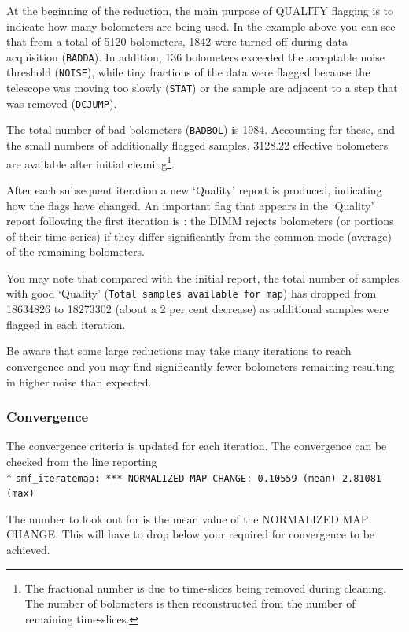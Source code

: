 At the beginning of the reduction, the main purpose of QUALITY
flagging is to indicate how many bolometers are being used. In the
example above you can see that from a total of 5120 bolometers, 1842
were turned off during data acquisition (\texttt{BADDA}). In addition,
136 bolometers exceeded the acceptable noise threshold
(\texttt{NOISE}), while tiny fractions of the data were flagged
because the telescope was moving too slowly (\texttt{STAT}) or the
sample are adjacent to a step that was removed (\texttt{DCJUMP}).

The total number of bad bolometers (\texttt{BADBOL}) is 1984.
Accounting for these, and the small numbers of additionally flagged
samples, 3128.22 effective bolometers are available after initial
cleaning\footnote{The fractional number is due to time-slices being
removed during cleaning. The number of bolometers is then
reconstructed from the number of remaining time-slices.}.


After each subsequent iteration a new `Quality' report is produced,
indicating how the flags have changed. An important flag that appears
in the `Quality' report following the first iteration is :
the DIMM rejects bolometers (or portions of their time series) if they
differ significantly from the common-mode (average) of the remaining
bolometers.

You may note that compared with the initial report, the total number
of samples with good `Quality' (\texttt{Total samples available for
  map}) has dropped from 18634826 to 18273302 (about a 2 per cent
decrease) as additional samples were flagged in each iteration.

Be aware that some large reductions may take many iterations to reach
convergence and you may find significantly fewer bolometers remaining
resulting in higher noise than expected.

\subsubsection*{Convergence}

The convergence criteria  is updated for each
iteration. The convergence can be checked from the line reporting\\*
\hspace*{0.5cm} \texttt{smf\_iteratemap: *** NORMALIZED MAP CHANGE:
  0.10559 (mean) 2.81081 (max)}

The number to look out for is the mean value of the NORMALIZED MAP CHANGE.
This will have to drop
below your required  for convergence to be achieved.

